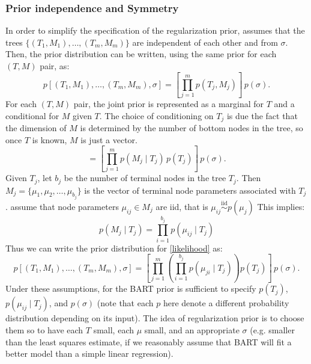 \documentclass[a4paper,11pt]{article}
\begin{document}
\subsubsection{Prior independence and Symmetry}
In order to simplify the specification of the regularization prior, \cite{chipmanBARTBayesianAdditive2010} assumes that the trees \( \{(T_1, M_1), \ldots, (T_m, M_m)\} \) are independent of each other and from \( \sigma \). Then, the prior distribution can be written, using the same prior for each $(T, M)$ pair, as:
\[
p[(T_1, M_1), \ldots, (T_m, M_m), \sigma] = \left[ \prod_{j=1}^m p(T_j, M_j) \right] \, p(\sigma).
\]
For each  $(T, M)$ pair, the joint prior is represented as a marginal for $T$ and a conditional for $M$ given $T$. The choice of conditioning on $T_j$ is due the fact that the dimension of $M$ is determined by the number of bottom nodes in the tree, so once $T$ is known, $M$ is just a vector. 
\[
= \left[ \prod_{j=1}^m p(M_j \mid T_j) \, p(T_j) \right] \, p(\sigma).
\]
Given $T_j$, let  \( b_j \)  be the number of terminal nodes in the tree \( T_j \). Then \( M_j = \{\mu_1, \mu_2, \ldots, \mu_{b_j}\} \) is the vector of terminal node parameters associated with \( T_j \).  \cite{chipmanBARTBayesianAdditive2010} assume that node parameters \( \mu_{ij} \in M_j\) are iid, that is $\mu_{ij} \overset{\mathrm{iid}}{\sim} p(\mu_j)$ This implies: 
\[
p(M_j \mid T_j) = \prod_{i=1}^{b_j} p(\mu_{ij} \mid T_j)
\]
Thus we can write the prior distribution for \eqref{likelihood} as:
\[
p[(T_1, M_1), \ldots, (T_m, M_m), \sigma]= \left[ \prod_{j=1}^m \left( \prod_{i=1}^{b_j} p(\mu_{ji} \mid T_j) \right) p(T_j) \right] \, p(\sigma).
\]
Under these assumptions, for the BART prior is sufficient to specify \( p(T_j) \), \( p(\mu_{ij} \mid T_j) \), and \( p(\sigma) \) (note that each $p$ here denote a different probability distribution depending on its input). The idea of regularization prior is to choose them so to have each $T$ small, each $\mu$ small, and an appropriate $\sigma$  (e.g. smaller than the least squares estimate, if we reasonably assume that BART will fit a better model than a simple linear regression). 
\end{document}
